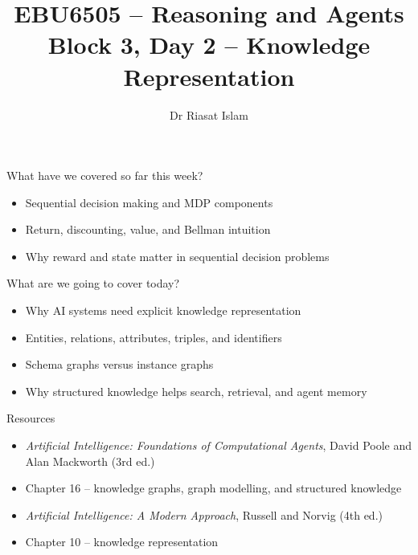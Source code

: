 \documentclass[aspectratio=169]{beamer}
\title[EBU6505 Block 3 Day 2]{EBU6505 -- Reasoning and Agents\\Block 3, Day 2 -- Knowledge Representation}
\author{Dr Riasat Islam}
\institute{Queen Mary University of London}
\date{}
\newcommand{\defaultdeckrefs}{AIMA4e Ch.10 pp.314--343; Poole3e Ch.16 pp.701--730}
\newcommand{\currentsliderefs}{\defaultdeckrefs}
\newcommand{\setslideref}[1]{\gdef\currentsliderefs{#1}}
\begin{document}
\setslideref{AIMA4e Ch.10 pp.314--343; Poole3e Ch.16 pp.701--730}
\begin{frame}
  \titlepage
\end{frame}

\setslideref{AIMA4e Ch.10 pp.314--343; Poole3e Ch.16 pp.701--730}
\begin{frame}{What have we covered so far this week?}
\begin{itemize}
  \item Sequential decision making and MDP components
  \item Return, discounting, value, and Bellman intuition
  \item Why reward and state matter in sequential decision problems
\end{itemize}
\end{frame}

\setslideref{AIMA4e Ch.10 pp.314--343; Poole3e Ch.16 pp.701--730}
\begin{frame}{What are we going to cover today?}
\begin{itemize}
  \item Why AI systems need explicit knowledge representation
  \item Entities, relations, attributes, triples, and identifiers
  \item Schema graphs versus instance graphs
  \item Why structured knowledge helps search, retrieval, and agent memory
\end{itemize}
\end{frame}

\setslideref{AIMA4e Ch.10 pp.314--343; Poole3e Ch.16 pp.701--730}
\begin{frame}{Resources}
\begin{itemize}
  \item \textit{Artificial Intelligence: Foundations of Computational Agents}, David Poole and Alan Mackworth (3rd ed.)
  \item Chapter 16 -- knowledge graphs, graph modelling, and structured knowledge
  \item \textit{Artificial Intelligence: A Modern Approach}, Russell and Norvig (4th ed.)
  \item Chapter 10 -- knowledge representation
\end{itemize}
\end{frame}
\end{document}
